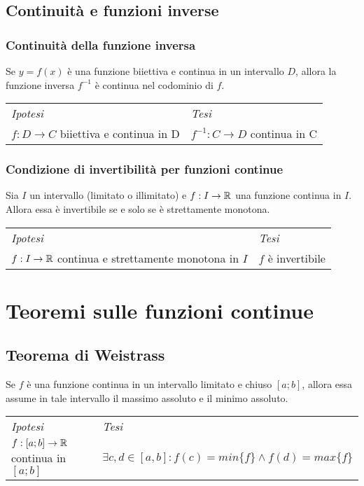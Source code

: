 \documentclass{book}     %
\begin{document}
\subsection{Continuità e funzioni inverse}
    \subsubsection{Continuità della funzione inversa}
        \begin{shadedTheorem}
            Se $y=f(x)$ è una funzione biiettiva e continua in un intervallo $D$, allora la funzione inversa $f^{-1}$ è continua nel codominio di $f$.
        \end{shadedTheorem}
        \begin{tabular}{m{}m{}}
            \textit{Ipotesi} & \textit{Tesi}  \\
            $f:D\to C$ biiettiva e continua in D & $f^{-1}:C\to D$ continua in C 
        \end{tabular}
        
    \subsubsection{Condizione di invertibilità per funzioni continue}
        \begin{shadedTheorem}
            Sia $I$ un intervallo (limitato o illimitato) e $f:I\rightarrow \mathbb{R}$ una funzione continua in $I$. Allora essa è invertibile se e solo se è strettamente monotona.
        \end{shadedTheorem}
        \begin{tabular}{m{}m{}}
            \textit{Ipotesi} & \textit{Tesi}  \\
            $f:I\to \mathbb{R}$ continua e strettamente monotona in $I$ & $f$ è invertibile 
        \end{tabular}
    
\section{Teoremi sulle funzioni continue}
    \subsection{Teorema di Weistrass}
        \begin{shadedTheorem}[Weistrass]
            Se $f$ è una funzione continua in un intervallo limitato e chiuso $[a;b]$, allora essa assume in tale intervallo il massimo assoluto e il minimo assoluto.
        \end{shadedTheorem}
        \begin{tabular}{m{}m{}}
            \textit{Ipotesi} & \textit{Tesi}  \\
            $f:[a;b]\to \mathbb{R}$ continua in $[a;b]$ & $\exists c,d \in [a,b] : f(c) = min\{f\} \land f(d) = max\{f\}$
        \end{tabular}
    
\end{document}
